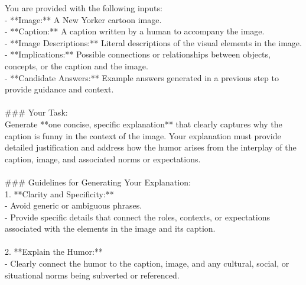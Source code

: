 \begin{figure*}[t]
\small

\begin{tcolorbox}[
    title=Prompt for Candidate and Final Explanations,
    colback=white,
    colframe=RedViolet,
    arc=0pt,        %
    outer arc=0pt,  %
]

You are provided with the following inputs:\\
- **\text{[}Image\text{]}:** A New Yorker cartoon image.\\
- **\text{[}Caption\text{]}:** A caption written by a human to accompany the image.\\
- **\text{[}Image Descriptions\text{]}:** Literal descriptions of the visual elements in the image.\\
- **\text{[}Implications\text{]}:** Possible connections or relationships between objects, concepts, or the caption and the image.\\
- **\text{[}Candidate Answers\text{]}:** Example answers generated in a previous step to provide guidance and context.\\
\\
\#\#\# Your Task:\\
Generate **one concise, specific explanation** that clearly captures why the caption is funny in the context of the image. Your explanation must provide detailed justification and address how the humor arises from the interplay of the caption, image, and associated norms or expectations.\\
\\
\#\#\# Guidelines for Generating Your Explanation:\\
1. **Clarity and Specificity:**  \\
   - Avoid generic or ambiguous phrases.  \\
   - Provide specific details that connect the roles, contexts, or expectations associated with the elements in the image and its caption.  \\
\\
2. **Explain the Humor:**  \\
- Clearly connect the humor to the caption, image, and any cultural, social, or situational norms being subverted or referenced.  \\

\end{tcolorbox}
\end{figure*}
